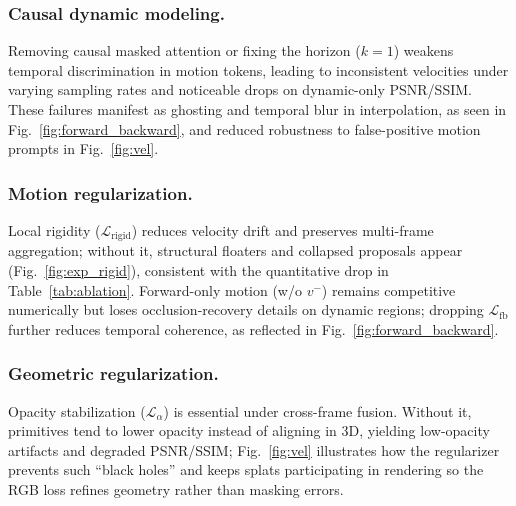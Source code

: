 \subsubsection{Causal dynamic modeling.}
Removing causal masked attention or fixing the horizon ($k{=}1$) weakens temporal discrimination in motion tokens, leading to inconsistent velocities under varying sampling rates and noticeable drops on dynamic-only PSNR/SSIM. These failures manifest as ghosting and temporal blur in interpolation, as seen in Fig.~\ref{fig:forward_backward}, and reduced robustness to false-positive motion prompts in Fig.~\ref{fig:vel}.

\subsubsection{Motion regularization.}
Local rigidity ($\mathcal{L}_{\text{rigid}}$) reduces velocity drift and preserves multi-frame aggregation; without it, structural floaters and collapsed proposals appear (Fig.~\ref{fig:exp_rigid}), consistent with the quantitative drop in Table~\ref{tab:ablation}. Forward-only motion (w/o $v^-$) remains competitive numerically but loses occlusion-recovery details on dynamic regions; dropping $\mathcal{L}_{\text{fb}}$ further reduces temporal coherence, as reflected in Fig.~\ref{fig:forward_backward}.

\subsubsection{Geometric regularization.}
Opacity stabilization ($\mathcal{L}_{\alpha}$) is essential under cross-frame fusion. Without it, primitives tend to lower opacity instead of aligning in 3D, yielding low-opacity artifacts and degraded PSNR/SSIM; Fig.~\ref{fig:vel} illustrates how the regularizer prevents such “black holes” and keeps splats participating in rendering so the RGB loss refines geometry rather than masking errors.
